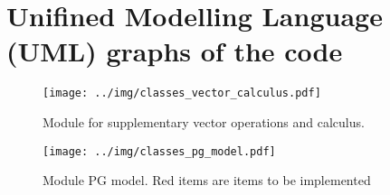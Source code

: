 \section{Unifined Modelling Language (UML) graphs of the code}

\begin{figure}[ht]
    \centering
    \texttt{[image: ../img/classes\_vector\_calculus.pdf]}
    \caption{Module for supplementary vector operations and calculus.}
\end{figure}


\begin{figure}[ht]
    \centering
    \texttt{[image: ../img/classes\_pg\_model.pdf]}
    \caption{Module PG model. Red items are items to be implemented}
\end{figure}
